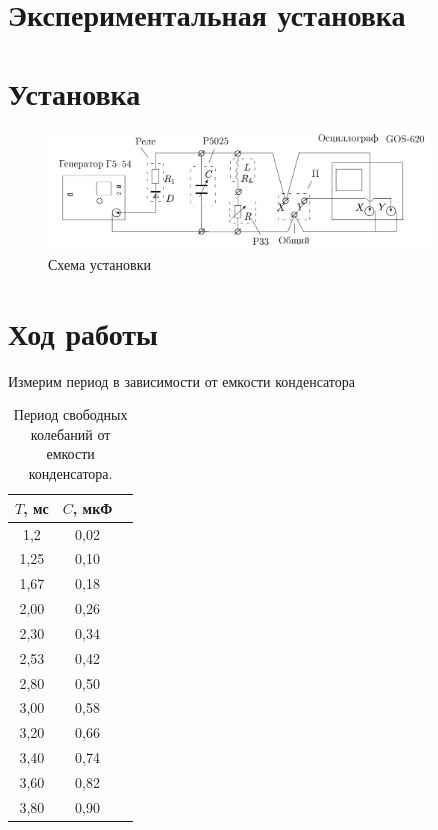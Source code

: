 \documentclass[a4paper, 12pt]{article}%
\begin{document}
\section*{Экспериментальная установка}
\section*{Установка}
\begin{figure}[h!]
\begin{center}
\includegraphics[width = 0.9\textwidth]{1.png}
\caption{Схема установки}
\end{center}
\end{figure}

\section*{Ход работы}
Измерим период в зависимости от емкости конденсатора

\begin{table}[h!]
\begin{center}

\begin{tabular}{|c|c|c|}
\hline
$T$, мс & $C$, мкФ  \\ \hline
1,2        & 0,02       \\ \hline
1,25      & 0,10      \\ \hline
1,67      & 0,18      \\ \hline
2,00 & 0,26 \\ \hline
2,30 & 0,34 \\ \hline
2,53 & 0,42 \\ \hline
2,80 & 0,50 \\ \hline
3,00 & 0,58 \\ \hline
3,20 & 0,66 \\ \hline
3,40 & 0,74 \\ \hline
3,60 & 0,82 \\ \hline
3,80 & 0,90 \\ \hline

\end{tabular}
\caption{Период свободных колебаний от емкости конденсатора.}
\end{center}
\end{table}
\end{document}

